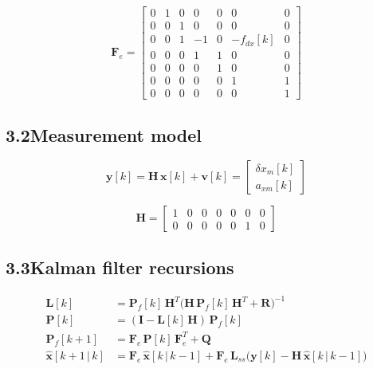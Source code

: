 \documentclass[11pt]{article}
\newcommand{\T}{^{T}}
\begin{document}
\[
\bm{F}_{e} =
\begin{bmatrix}
  0 & 1 & 0 & 0 & 0 & 0 & 0 \\
  0 & 0 & 1 & 0 & 0 & 0 & 0 \\
  0 & 0 & 1 & -1 & 0 & -f_{dx}[k] & 0 \\
  0 & 0 & 0 & 1 & 1 & 0 & 0 \\
  0 & 0 & 0 & 0 & 1 & 0 & 0 \\
  0 & 0 & 0 & 0 & 0 & 1 & 1 \\
  0 & 0 & 0 & 0 & 0 & 0 & 1
\end{bmatrix}
\]

\subsection*{3.2\quad Measurement model}

\begin{equation}
\bm{y}[k] = \bm{H}\,\bm{x}[k] + \bm{v}[k]
  = \begin{bmatrix}\delta x_m[k]\\[2pt] a_{xm}[k]\end{bmatrix}
\end{equation}

\[
\bm{H} =
\begin{bmatrix}
  1 & 0 & 0 & 0 & 0 & 0 & 0 \\
  0 & 0 & 0 & 0 & 0 & 1 & 0
\end{bmatrix}
\]

\subsection*{3.3\quad Kalman filter recursions}

\begin{align}
\bm{L}[k]                  &= \bm{P}_f[k]\,\bm{H}\T\bigl(\bm{H}\,\bm{P}_f[k]\,\bm{H}\T + \bm{R}\bigr)^{-1} \\[2pt]
\bm{P}[k]                  &= (\bm{I} - \bm{L}[k]\,\bm{H})\,\bm{P}_f[k] \\[2pt]
\bm{P}_f[k\!+\!1]          &= \bm{F}_{e}\,\bm{P}[k]\,\bm{F}_{e}\T + \bm{Q} \\[2pt]
\hat{\bm{x}}[k\!+\!1\,|\,k] &= \bm{F}_{e}\,\hat{\bm{x}}[k\,|\,k\!-\!1]
  + \bm{F}_{e}\,\bm{L}_{ss}\bigl(\bm{y}[k] - \bm{H}\,\hat{\bm{x}}[k\,|\,k\!-\!1]\bigr)
\end{align}

\setcounter{section}{4}

\end{document}

